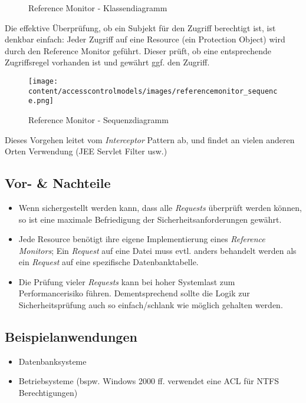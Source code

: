 \begin{figure}[H]
	\begin{center}
	\end{center}
\caption{Reference Monitor - Klassendiagramm}
\end{figure}

Die effektive Überprüfung, ob ein Subjekt für den Zugriff berechtigt ist, ist denkbar einfach: Jeder Zugriff auf eine Resource (ein Protection Object) wird durch den Reference Monitor geführt. Dieser prüft, ob eine entsprechende Zugriffsregel vorhanden ist und gewährt ggf. den Zugriff.

\begin{figure}[H]
	\texttt{[image: content/accesscontrolmodels/images/referencemonitor\_sequence.png]}
	\caption{Reference Monitor - Sequenzdiagramm \cite{SecPatterns06}}
\end{figure}

Dieses Vorgehen leitet vom \emph{Interceptor} Pattern ab, und findet an vielen anderen Orten Verwendung (JEE Servlet Filter usw.)


\subsection*{Vor- \& Nachteile}
\begin{itemize}
	\item Wenn sichergestellt werden kann, dass alle \emph{Requests} überprüft werden können, so ist eine maximale Befriedigung der Sicherheitsanforderungen gewährt.
	\item Jede Resource benötigt ihre eigene Implementierung eines \emph{Reference Monitors}; Ein \emph{Request} auf eine Datei muss evtl. anders behandelt werden als ein \emph{Request} auf eine spezifische Datenbanktabelle.
	\item Die Prüfung vieler \emph{Requests} kann bei hoher Systemlast zum Performancerisiko führen. Dementsprechend sollte die Logik zur Sicherheitsprüfung auch so einfach/schlank wie möglich gehalten werden.
\end{itemize}

\subsection*{Beispielanwendungen}
\begin{itemize}
	\item Datenbanksysteme
	\item Betriebsysteme (bspw. Windows 2000 ff. verwendet eine ACL für NTFS Berechtigungen)
\end{itemize}